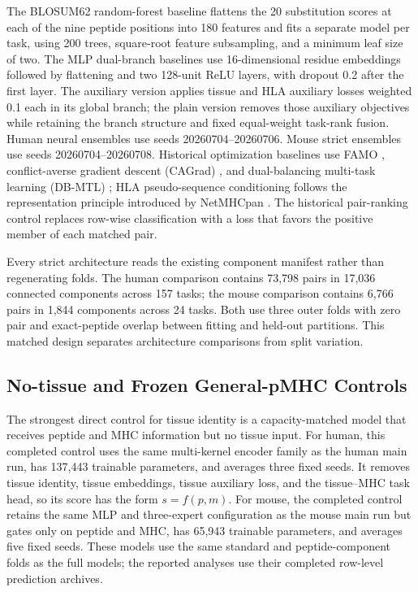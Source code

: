 The BLOSUM62 random-forest baseline \cite{henikoff1992blosum} flattens the 20 substitution scores at each of the nine peptide positions into 180 features and fits a separate model per task, using 200 trees, square-root feature subsampling, and a minimum leaf size of two. The MLP dual-branch baselines use 16-dimensional residue embeddings followed by flattening and two 128-unit ReLU layers, with dropout 0.2 after the first layer. The auxiliary version applies tissue and HLA auxiliary losses weighted 0.1 each in its global branch; the plain version removes those auxiliary objectives while retaining the branch structure and fixed equal-weight task-rank fusion. Human neural ensembles use seeds 20260704--20260706. Mouse strict ensembles use seeds 20260704--20260708. Historical optimization baselines use FAMO \cite{liu2023famo}, conflict-averse gradient descent (CAGrad) \cite{liu2021cagrad}, and dual-balancing multi-task learning (DB-MTL) \cite{lin2023dbmtl}; HLA pseudo-sequence conditioning follows the representation principle introduced by NetMHCpan \cite{nielsen2007netmhcpan}. The historical pair-ranking control replaces row-wise classification with a loss that favors the positive member of each matched pair.

Every strict architecture reads the existing component manifest rather than regenerating folds. The human comparison contains 73,798 pairs in 17,036 connected components across 157 tasks; the mouse comparison contains 6,766 pairs in 1,844 components across 24 tasks. Both use three outer folds with zero pair and exact-peptide overlap between fitting and held-out partitions. This matched design separates architecture comparisons from split variation.

\subsection{No-tissue and Frozen General-pMHC Controls}

The strongest direct control for tissue identity is a capacity-matched model that receives peptide and MHC information but no tissue input. For human, this completed control uses the same multi-kernel encoder family as the human main run, has 137,443 trainable parameters, and averages three fixed seeds. It removes tissue identity, tissue embeddings, tissue auxiliary loss, and the tissue--MHC task head, so its score has the form \(s=f(p,m)\). For mouse, the completed control retains the same MLP and three-expert configuration as the mouse main run but gates only on peptide and MHC, has 65,943 trainable parameters, and averages five fixed seeds. These models use the same standard and peptide-component folds as the full models; the reported analyses use their completed row-level prediction archives.

